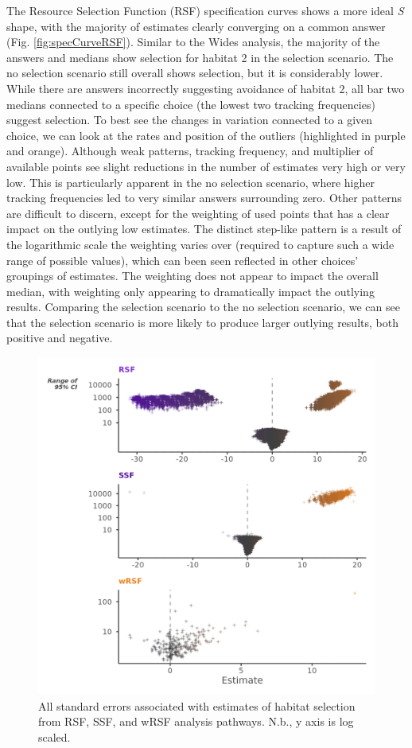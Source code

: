 \documentclass[10pt,a4paper]{article}
\begin{document}
The Resource Selection Function (RSF) specification curves shows a more ideal \emph{S} shape, with the majority of estimates clearly converging on a common answer (Fig. \ref{fig:specCurveRSF}).
Similar to the Wides analysis, the majority of the answers and medians show selection for habitat 2 in the selection scenario.
The no selection scenario still overall shows selection, but it is considerably lower.
While there are answers incorrectly suggesting avoidance of habitat 2, all bar two medians connected to a specific choice (the lowest two tracking frequencies) suggest selection.
To best see the changes in variation connected to a given choice, we can look at the rates and position of the outliers (highlighted in purple and orange).
Although weak patterns, tracking frequency, and multiplier of available points see slight reductions in the number of estimates very high or very low.
This is particularly apparent in the no selection scenario, where higher tracking frequencies led to very similar answers surrounding zero.
Other patterns are difficult to discern, except for the weighting of used points that has a clear impact on the outlying low estimates.
The distinct step-like pattern is a result of the logarithmic scale the weighting varies over (required to capture such a wide range of possible values), which can been seen reflected in other choices' groupings of estimates.
The weighting does not appear to impact the overall median, with weighting only appearing to dramatically impact the outlying results.
Comparing the selection scenario to the no selection scenario, we can see that the selection scenario is more likely to produce larger outlying results, both positive and negative.

\begin{figure}
\includegraphics[width=1\linewidth]{../figures/uncertaintyPlot} \caption{All standard errors associated with estimates of habitat selection from RSF, SSF, and wRSF analysis pathways. N.b., y axis is log scaled.}\label{fig:uncertaintyPlot}
\end{figure}
\end{document}
